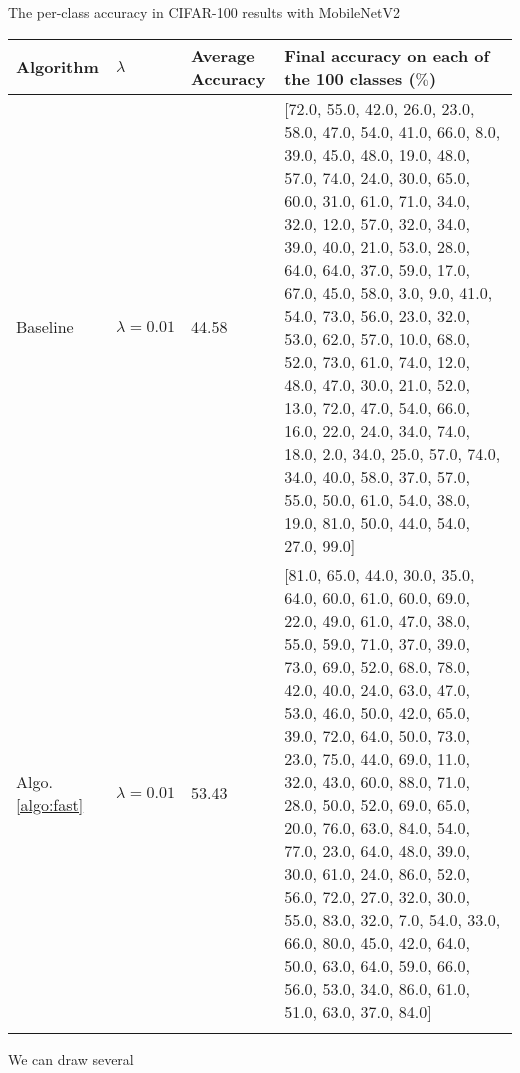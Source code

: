 \begin{table}[!hpb]
	\centering
	{The per-class accuracy in CIFAR-100 results with MobileNetV2}
	\label{tab:firstone}
	\begin{tabular}{@{}lllp{8cm}@{}} \toprule
		Algorithm & $\lambda$ &Average Accuracy&  Final accuracy on each of the 100 classes ($\%$)\\ \midrule
		Baseline&$\lambda=0.01$&  44.58& [72.0, 55.0, 42.0, 26.0, 23.0, 58.0, 47.0, 54.0, 41.0, 66.0, 8.0, 39.0, 45.0, 48.0, 19.0, 48.0, 57.0, 74.0, 24.0, 30.0, 65.0, 60.0, 31.0, 61.0, 71.0, 34.0, 32.0, 12.0, 57.0, 32.0, 34.0, 39.0, 40.0, 21.0, 53.0, 28.0, 64.0, 64.0, 37.0, 59.0, 17.0, 67.0, 45.0, 58.0, 3.0, 9.0, 41.0, 54.0, 73.0, 56.0, 23.0, 32.0, 53.0, 62.0, 57.0, 10.0, 68.0, 52.0, 73.0, 61.0, 74.0, 12.0, 48.0, 47.0, 30.0, 21.0, 52.0, 13.0, 72.0, 47.0, 54.0, 66.0, 16.0, 22.0, 24.0, 34.0, 74.0, 18.0, 2.0, 34.0, 25.0, 57.0, 74.0, 34.0, 40.0, 58.0, 37.0, 57.0, 55.0, 50.0, 61.0, 54.0, 38.0, 19.0, 81.0, 50.0, 44.0, 54.0, 27.0, 99.0]\\
		Algo. \ref{algo:fast}&$\lambda=0.01$&  53.43& [81.0, 65.0, 44.0, 30.0, 35.0, 64.0, 60.0, 61.0, 60.0, 69.0, 22.0, 49.0, 61.0, 47.0, 38.0, 55.0, 59.0, 71.0, 37.0, 39.0, 73.0, 69.0, 52.0, 68.0, 78.0, 42.0, 40.0, 24.0, 63.0, 47.0, 53.0, 46.0, 50.0, 42.0,
		65.0, 39.0, 72.0, 64.0, 50.0, 73.0, 23.0, 75.0, 44.0, 69.0, 11.0, 32.0, 43.0, 60.0, 88.0, 71.0, 28.0, 50.0, 52.0, 69.0, 65.0, 20.0, 76.0, 63.0, 84.0, 54.0, 77.0, 23.0, 64.0, 48.0, 39.0, 30.0, 61.0, 24.0,
		86.0, 52.0, 56.0, 72.0, 27.0, 32.0, 30.0, 55.0, 83.0, 32.0, 7.0, 54.0, 33.0, 66.0, 80.0, 45.0, 42.0, 64.0, 50.0, 63.0, 64.0, 59.0, 66.0, 56.0, 53.0, 34.0, 86.0, 61.0, 51.0, 63.0, 37.0, 84.0]
		\\ \bottomrule
		\label{tab:cifar100_mobile}
	\end{tabular}
\end{table}

We can draw several








